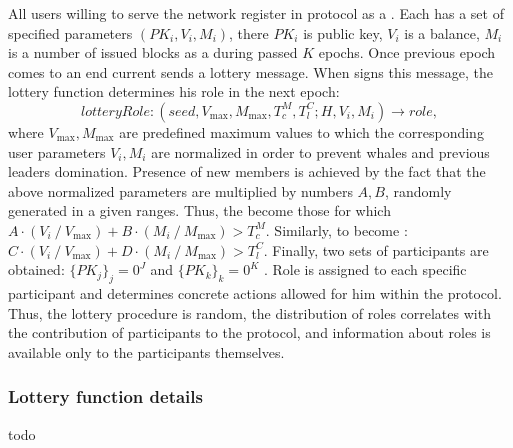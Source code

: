 All users willing to serve the network register in protocol as a .
Each  has a set of specified parameters ${(PK_i, V_i, M_i)}$, there $PK_i$ is public key, $V_i$ is a balance, $M_i$ is a number of issued blocks as a  during passed $K$ epochs.
Once previous epoch comes to an end current  sends a lottery message.
When  signs this message, the lottery function determines his role in the next epoch:
\begin{equation}
{lotteryRole:(seed, V_{\max}, M_{\max}, T_c^M, T_l^C; H, V_i, M_i) \rightarrow role}
    ,\label{eq:equation3}
\end{equation}
where ${V_{\max}, M_{\max}}$ are predefined maximum values to which the corresponding user parameters ${V_i, M_i}$ are normalized in order to prevent whales and previous leaders domination.
Presence of new members is achieved by the fact that the above normalized parameters are multiplied by numbers ${A, B}$, randomly generated in a given ranges.
Thus, the  become those  for which ${A \cdot (V_i\mathbin{/}V_{\max}) + B \cdot (M_i\mathbin{/}M_{\max}) > T_c^M}$.
Similarly, to become : ${C \cdot (V_i\mathbin{/}V_{\max}) + D \cdot (M_i\mathbin{/}M_{\max}) > T_l^C}$.
Finally, two sets of participants are obtained: ${\{PK_j\}_j=0^J}$  and ${\{PK_k\}_k=0^K}$ .
Role is assigned to each specific participant and determines concrete actions allowed for him within the protocol.
Thus, the lottery procedure is random, the distribution of roles correlates with the contribution of participants to the protocol, and information about roles is available only to the participants themselves.

\subsubsection{Lottery function details}\label{subsubsec:lottery-function-details}
todo

